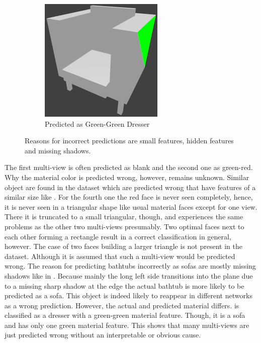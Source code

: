 \begin{figure}
\begin{subfigure}{.3\textwidth}
		\centering
		\includegraphics[width=.8\textwidth]{images/sofa_0681_1_010.png}
		\caption{Predicted as Green-Green Dresser}
		\label{fig:small-features-f}
	\end{subfigure}
	\caption[Reasons for Incorrect Predictions]{Reasons for incorrect predictions are small features, hidden features and missing shadows.}
	\label{fig:small-features}
\end{figure}
The first multi-view is often predicted as blank and the second one as green-red.
Why the material color is predicted wrong, however, remains unknown.
Similar object are found in the dataset which are predicted wrong that have features of a similar size like .
For the fourth one the red face is never seen completely, hence, it is never seen in a triangular shape like usual material faces except for one view.
There it is truncated to a small triangular, though, and experiences the same problems as the other two multi-views presumably.
Two optimal faces next to each other forming a rectangle result in a correct classification in general, however.
The case of two faces building a larger triangle is not present in the dataset.
Although it is assumed that such a multi-view would be predicted wrong.
The reason for predicting bathtubs incorrectly as sofas are mostly missing shadows like in .
Because mainly the long left side transitions into the plane due to a missing sharp shadow at the edge the actual bathtub is more likely to be predicted as a sofa.
This object is indeed likely to reappear in different networks as a wrong prediction.
However, the actual and predicted material differs.
 is classified as a dresser with a green-green material feature.
Though, it is a sofa and has only one green material feature.
This shows that many multi-views are just predicted wrong without an interpretable or obvious cause.